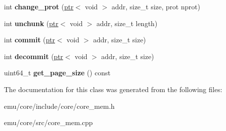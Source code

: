 \begin{DoxyCompactItemize}
\item 
\mbox{\label{classeka2l1_1_1memory__system_adaf5d80b70c3cf25e216047ed2b8170a}} 
int {\bfseries change\+\_\+prot} (\mbox{\hyperlink{classeka2l1_1_1ptr}{ptr}}$<$ void $>$ addr, size\+\_\+t size, prot nprot)
\item 
\mbox{\label{classeka2l1_1_1memory__system_a51ec643f96ac9763d31bd4b42b68beb2}} 
int {\bfseries unchunk} (\mbox{\hyperlink{classeka2l1_1_1ptr}{ptr}}$<$ void $>$ addr, size\+\_\+t length)
\item 
\mbox{\label{classeka2l1_1_1memory__system_a783e7412ecbfd5393040992175c6445c}} 
int {\bfseries commit} (\mbox{\hyperlink{classeka2l1_1_1ptr}{ptr}}$<$ void $>$ addr, size\+\_\+t size)
\item 
\mbox{\label{classeka2l1_1_1memory__system_a6fdb55f1ae37051c84b34f035658468e}} 
int {\bfseries decommit} (\mbox{\hyperlink{classeka2l1_1_1ptr}{ptr}}$<$ void $>$ addr, size\+\_\+t size)
\item 
\mbox{\label{classeka2l1_1_1memory__system_af7e38eae7be048563096449bb070c21e}} 
uint64\+\_\+t {\bfseries get\+\_\+page\+\_\+size} () const
\end{DoxyCompactItemize}


The documentation for this class was generated from the following files\+:\begin{DoxyCompactItemize}
\item 
emu/core/include/core/core\+\_\+mem.\+h\item 
emu/core/src/core\+\_\+mem.\+cpp\end{DoxyCompactItemize}
